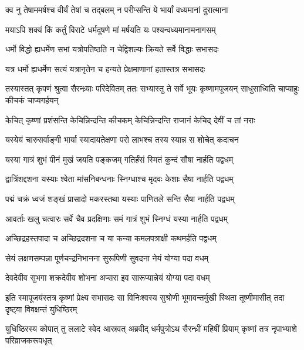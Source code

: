 \twolineshloka
{क्व नु तेषाममर्षश्च वीर्यं तेषां च तद्बलम्}
{न परीप्सन्ति ये भार्यां वध्यमानां दुरात्माना}


\twolineshloka
{मयाऽपि शक्यं किं कर्तुं विराटे धर्मदूषणे}
{मां मर्षयति यः पश्यन्वध्यमानामनागसम्}


\twolineshloka
{धर्मो विद्धो ह्यधर्मेण सभां यत्रोपतिष्ठति}
{न चेद्विशल्यः क्रियते सर्वे विद्धाः सभासदः}


\twolineshloka
{यत्र धर्मो ह्यधर्मेण सत्यं यत्रानृतेन च}
{हन्यते प्रेक्षमाणानां हतास्तत्र सभासदः}



\threelineshloka
{तस्यास्तत् कृपणं श्रुत्वा सैरन्ध्र्याः परिदेवितम्}
{ततः सभ्यास्तु ते सर्वे भूयः कृष्णामपूजयन्}
{साधुसाध्विति चाप्याहुः कीचकं चाप्यगर्हयन्}


\twolineshloka
{केचित् कृष्णां प्रशंसन्ति केचिन्निन्दन्ति कीचकम्}
{केचिन्निन्दन्ति राजानं केचिद् देवीं च तां नराः}




\twolineshloka
{यस्येयं चारुसर्वाङ्गी भार्या स्यादायतेक्षणा}
{परो लाभश्च तस्य स्यान्न स शोचेत् कदाचन}


\twolineshloka
{यस्या गात्रं शुभं पीनं मुखं जयति पङ्कजम्}
{गतिर्हंसं स्मितं कुन्दं सौषा नार्हति पद्वधम्}


\twolineshloka
{द्वात्रिंशद्दशना यस्याः श्वेता मांसनिबन्धनाः}
{स्निग्धाश्च मृदवः केशाः सैषा नार्हति पद्वधम्}


\twolineshloka
{पद्मं चक्रं ध्वजं शङ्खं प्रासादो मकरस्तथा}
{यस्याः पाणितले सन्ति सैषा नार्हति पद्वधम्}


\twolineshloka
{आवर्ताः खलु चत्वारः सर्वे चैव प्रदक्षिणाः}
{समं गात्रं शुभं स्निग्धं यस्या नार्हति पद्वधम्}


\twolineshloka
{अच्छिद्रहस्तपादा च अच्छिद्रदशना च या}
{कन्या कमलपत्राक्षी कथमर्हति पद्वधम्}


\twolineshloka
{सेयं लक्षणसम्पन्ना पूर्णचन्द्रनिभानना}
{सुरूपिणी सुवदना नेयं योग्या पदा वधम्}


\twolineshloka
{देवदेवीव सुभगा शक्रदेवीव शोभना}
{अप्सरा इव सारूप्यान्नेयं योग्या पदा वधम्}


\onelineshloka
{इति स्मापूजयंस्तत्र कृष्णां प्रेक्ष्य सभासदः}
\twolineshloka
{सा विनिःश्वस्य सुश्रोणी भूमावन्तर्मुखी स्थिता}
{तूष्णीमासीत् तदा दृष्ट्वा विवक्षन्तं युधिष्ठिरम्}


\threelineshloka
{युधिष्ठिरस्य कोपात् तु ललाटे स्वेद आस्रवत्}
{अब्रवीद् धर्मपुत्रोऽथ सैरन्ध्रीं महिषीं प्रियाम्}
{कृष्णां तत्र नृपाभ्याशे परिव्राजकरूपधृत्}


